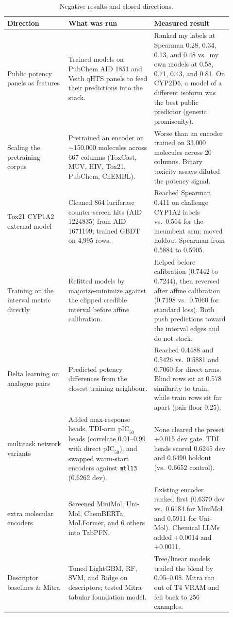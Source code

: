 \documentclass[11pt]{article}
\begin{document}
\begin{table}[H]
\centering
\small
\begin{tabular}{p{0.25\linewidth}p{0.35\linewidth}p{0.32\linewidth}}
\toprule
Direction & What was run & Measured result \\
\midrule
Public potency panels as features & Trained models on PubChem AID 1851 and Veith qHTS panels to feed their predictions into the stack. & Ranked my labels at Spearman 0.28, 0.34, 0.13, and 0.48 vs.\ my own models at 0.58, 0.71, 0.43, and 0.81. On CYP2D6, a model of a different isoform was the best public predictor (generic promiscuity). \\
\addlinespace
Scaling the pretraining corpus & Pretrained an encoder on $\sim$150,000 molecules across 667 columns (ToxCast, MUV, HIV, Tox21, PubChem, ChEMBL). & Worse than an encoder trained on 33,000 molecules across 20 columns. Binary toxicity assays diluted the potency signal. \\
\addlinespace
Tox21 CYP1A2 external model & Cleaned 864 luciferase counter-screen hits (AID 1224835) from AID 1671199; trained GBDT on 4,995 rows. & Reached Spearman 0.411 on challenge CYP1A2 labels vs.\ 0.564 for the incumbent arm; moved holdout Spearman from 0.5884 to 0.5905. \\
\addlinespace
Training on the interval metric directly & Refitted models by majorize-minimize against the clipped credible interval before affine calibration. & Helped before calibration (0.7442 to 0.7244), then reversed after affine calibration (0.7198 vs.\ 0.7060 for standard loss). Both push predictions toward the interval edges and do not stack. \\
\addlinespace
Delta learning on analogue pairs & Predicted potency differences from the closest training neighbour. & Reached 0.4488 and 0.5426 vs.\ 0.5881 and 0.7060 for direct arms. Blind rows sit at 0.578 similarity to train, while train rows sit far apart (pair floor 0.25). \\
\addlinespace
5 multitask network variants & Added max-response heads, TDI-arm $\text{pIC}_{50}$ heads (correlate 0.91--0.99 with direct $\text{pIC}_{50}$), and swapped warm-start encoders against \texttt{mtl13} (0.6262 dev). & None cleared the preset +0.015 dev gate. TDI heads scored 0.6245 dev and 0.6490 holdout (vs.\ 0.6652 control). \\
\addlinespace
10 extra molecular encoders & Screened MiniMol, Uni-Mol, ChemBERTa, MoLFormer, and 6 others into TabPFN. & Existing encoder ranked first (0.6370 dev vs.\ 0.6184 for MiniMol and 0.5911 for Uni-Mol). Chemical LLMs added +0.0014 and +0.0011. \\
\addlinespace
Descriptor baselines \& Mitra & Tuned LightGBM, RF, SVM, and Ridge on descriptors; tested Mitra tabular foundation model. & Tree/linear models trailed the blend by 0.05--0.08. Mitra ran out of T4 VRAM and fell back to 256 examples. \\
\bottomrule
\end{tabular}
\caption{Negative results and closed directions.}
\label{tab:negative}
\end{table}
\end{document}
